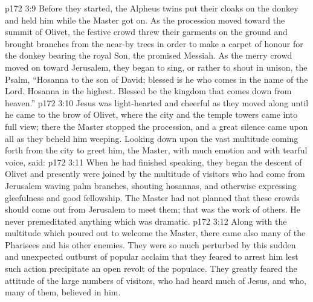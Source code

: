\vs p172 3:9 Before they started, the Alpheus twins put their cloaks on the donkey and held him while the Master got on. As the procession moved toward the summit of Olivet, the festive crowd threw their garments on the ground and brought branches from the near\hyp{}by trees in order to make a carpet of honour for the donkey bearing the royal Son, the promised Messiah. As the merry crowd moved on toward Jerusalem, they began to sing, or rather to shout in unison, the Psalm, “Hosanna to the son of David; blessed is he who comes in the name of the Lord. Hosanna in the highest. Blessed be the kingdom that comes down from heaven.”
\vs p172 3:10 Jesus was light\hyp{}hearted and cheerful as they moved along until he came to the brow of Olivet, where the city and the temple towers came into full view; there the Master stopped the procession, and a great silence came upon all as they beheld him weeping. Looking down upon the vast multitude coming forth from the city to greet him, the Master, with much emotion and with tearful voice, said: 
\vs p172 3:11 When he had finished speaking, they began the descent of Olivet and presently were joined by the multitude of visitors who had come from Jerusalem waving palm branches, shouting hosannas, and otherwise expressing gleefulness and good fellowship. The Master had not planned that these crowds should come out from Jerusalem to meet them; that was the work of others. He never premeditated anything which was dramatic.
\vs p172 3:12 Along with the multitude which poured out to welcome the Master, there came also many of the Pharisees and his other enemies. They were so much perturbed by this sudden and unexpected outburst of popular acclaim that they feared to arrest him lest such action precipitate an open revolt of the populace. They greatly feared the attitude of the large numbers of visitors, who had heard much of Jesus, and who, many of them, believed in him.
